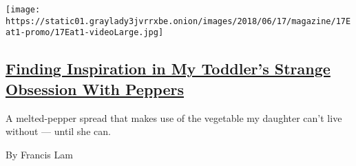 \begin{enumerate}
  \texttt{[image: https://static01.graylady3jvrrxbe.onion/images/2018/06/17/magazine/17Eat1-promo/17Eat1-videoLarge.jpg]}

  \hypertarget{finding-inspiration-in-my-toddlers-strange-obsession-with-peppers}{%
  \subsection{\texorpdfstring{\href{/2018/06/13/magazine/toddler-obsession-peppers-spread.html}{Finding
  Inspiration in My Toddler's Strange Obsession With
  Peppers}}{Finding Inspiration in My Toddler's Strange Obsession With Peppers}}\label{finding-inspiration-in-my-toddlers-strange-obsession-with-peppers}}

  A melted-pepper spread that makes use of the vegetable my daughter
  can't live without --- until she can.

  By Francis Lam
\end{enumerate}

